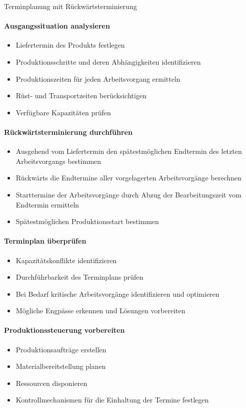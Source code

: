 \begin{KR}{Terminplanung mit Rückwärtsterminierung}\\
\paragraph{Ausgangssituation analysieren}
\begin{itemize}
    \item Liefertermin des Produkts festlegen
    \item Produktionsschritte und deren Abhängigkeiten identifizieren
    \item Produktionszeiten für jeden Arbeitsvorgang ermitteln
    \item Rüst- und Transportzeiten berücksichtigen
    \item Verfügbare Kapazitäten prüfen
\end{itemize}

\paragraph{Rückwärtsterminierung durchführen}
\begin{itemize}
    \item Ausgehend vom Liefertermin den spätestmöglichen Endtermin des letzten Arbeitsvorgangs bestimmen
    \item Rückwärts die Endtermine aller vorgelagerten Arbeitsvorgänge berechnen
    \item Starttermine der Arbeitsvorgänge durch Abzug der Bearbeitungszeit vom Endtermin ermitteln
    \item Spätestmöglichen Produktionsstart bestimmen
\end{itemize}

\paragraph{Terminplan überprüfen}
\begin{itemize}
    \item Kapazitätskonflikte identifizieren
    \item Durchführbarkeit des Terminplans prüfen
    \item Bei Bedarf kritische Arbeitsvorgänge identifizieren und optimieren
    \item Mögliche Engpässe erkennen und Lösungen vorbereiten
\end{itemize}

\paragraph{Produktionssteuerung vorbereiten}
\begin{itemize}
    \item Produktionsaufträge erstellen
    \item Materialbereitstellung planen
    \item Ressourcen disponieren
    \item Kontrollmechanismen für die Einhaltung der Termine festlegen
\end{itemize}


\end{KR}
